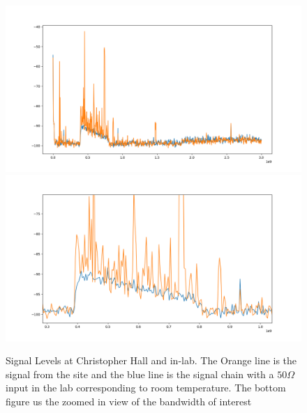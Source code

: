 \documentclass[11pt,letterpaper]{article}
\begin{document}
\begin{figure}
\centering
	\includegraphics[width = \textwidth]{Figure_1-1}
	\includegraphics[width = \textwidth]{Figure_1-2}
	\caption{Signal Levels at Christopher Hall and in-lab. The Orange line is the signal from the site and the blue line is the signal chain with a $50 \Omega$ input in the lab corresponding to room temperature. The bottom figure us the zoomed in view of the bandwidth of interest} \label{fig:signallevels}

\end{figure}
\end{document}
